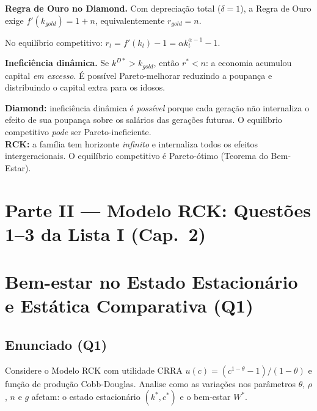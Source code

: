 \documentclass[12pt, a4paper]{article}
\begin{document}
\textbf{Regra de Ouro no Diamond.} Com depreciação total ($\delta=1$), a Regra de Ouro exige $f'(k_{gold}) = 1+n$, equivalentemente $r_{gold} = n$.

No equilíbrio competitivo: $r_t = f'(k_t) - 1 = \alpha k_t^{\alpha-1} - 1$.

\textbf{Ineficiência dinâmica.} Se $k^{D*} > k_{gold}$, então $r^* < n$: a economia acumulou capital \emph{em excesso}. É possível Pareto-melhorar reduzindo a poupança e distribuindo o capital extra para os idosos.

\begin{provabox}[title={Ineficiência Dinâmica no Diamond vs.\ RCK}]
\textbf{Diamond:} ineficiência dinâmica é \emph{possível} porque cada geração não internaliza o efeito de sua poupança sobre os salários das gerações futuras. O equilíbrio competitivo \emph{pode} ser Pareto-ineficiente.\\
\textbf{RCK:} a família tem horizonte \emph{infinito} e internaliza todos os efeitos intergeracionais. O equilíbrio competitivo é Pareto-ótimo (Teorema do Bem-Estar).
\end{provabox}

\section*{Parte II --- Modelo RCK: Questões 1--3 da Lista I (Cap.\ 2)}

\setcounter{section}{0}

\section{Bem-estar no Estado Estacionário e Estática Comparativa (Q1)}

\subsection*{Enunciado (Q1)}

Considere o Modelo RCK com utilidade CRRA $u(c) = (c^{1-\theta}-1)/(1-\theta)$ e função de produção Cobb-Douglas. Analise como as variações nos parâmetros $\theta$, $\rho$, $n$ e $g$ afetam: o estado estacionário $(k^*, c^*)$ e o bem-estar $W^*$.
\end{document}
